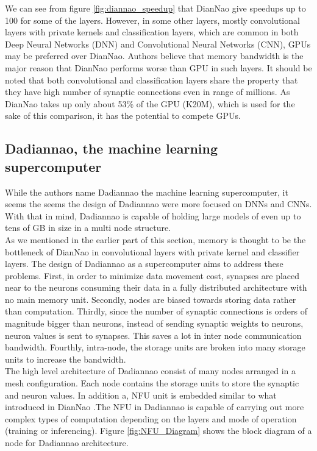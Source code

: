\documentclass[runningheads,a4paper]{llncs}
\begin{document}
We can see from figure \ref{fig:diannao_speedup} that DianNao give speedups up to 100 for some of the layers. However, in some other layers, mostly convolutional layers with private kernels and classification layers, which are common in both Deep Neural Networks (DNN) and Convolutional Neural Networks (CNN), GPUs may be preferred over DianNao. Authors believe that memory bandwidth is the major reason that DianNao performs worse than GPU in such layers. It should be noted that both convolutional and classification layers share the property that they have high number of synaptic connections even in range of millions. As DianNao takes up only about 53\% of the GPU (K20M), which is used for the sake of this comparison, it has the potential to compete GPUs.
\subsection*{Dadiannao, the machine learning supercomputer}

While the authors name Dadiannao the machine learning supercomputer, it seems the seems the design of Dadiannao were more focused on DNNs and CNNs. With that in mind, Dadiannao is capable of holding large models of even up to tens of GB in size in a multi node structure.\\

As we mentioned in the earlier part of this section, memory is thought to be the bottleneck of DianNao in convolutional layers with private kernel and classifier layers. The design of Dadiannao as a supercomputer aims to address these problems. First, in order to minimize data movement cost, synapses are placed near to the neurons consuming their data in a fully distributed architecture with no main memory unit. Secondly, nodes are biased towards storing data rather than computation. Thirdly, since the number of synaptic connections is orders of magnitude bigger than neurons,  instead of sending synaptic weights to neurons, neuron values is sent to synapses. This saves a lot in inter node communication bandwidth. Fourthly, intra-node, the storage units are broken into many storage units to increase the bandwidth.\\

The high level architecture of Dadiannao consist of many nodes arranged in a mesh configuration. Each node contains the storage units to store the synaptic and neuron values. In addition a, NFU unit is embedded similar to what introduced in DianNao \cite{chen2014diannao}.The NFU in Dadiannao is capable of carrying out more complex types of computation depending on the layers and mode of operation (training or inferencing). Figure \ref{fig:NFU_Diagram} shows the block diagram of a node for Dadiannao architecture. \\
\end{document}
